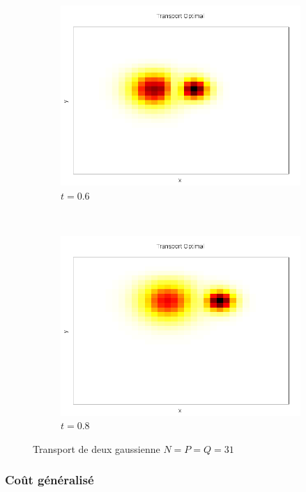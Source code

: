 \documentclass[a4paper,12pt]{article}
\begin{document}
\begin{figure}[!h]
\begin{subfigure}[b]{0.22\linewidth}
	\includegraphics[width=\textwidth]{img/2DMixture/C_00021.png}
	\caption{$t=0.6$}
	\end{subfigure}
	~
	\begin{subfigure}[b]{0.22\linewidth}
	\includegraphics[width=\textwidth]{img/2DMixture/C_00028.png}
	\caption{$t=0.8$}
	\end{subfigure}
	\caption{Transport de deux gaussienne $N=P=Q=31$}
\end{figure}





\newpage


\subsubsection{Coût généralisé}
\end{document}
